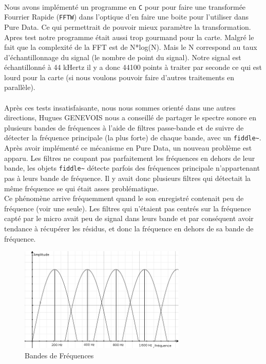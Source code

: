 \documentclass[a4paper, titlepage, oneside, 12pt]{article}%
\begin{document}
\paragraph{}
Nous avons implémenté un programme en \texttt{C} pour pour faire une transformée Fourrier Rapide (\texttt{FFTW}) dans l'optique d'en faire une boite pour l'utiliser dans Pure Data.
Ce qui permettrait de pouvoir mieux paramètre la transformation.\\

Apres test notre programme était aussi trop gourmand pour la carte. Malgré le fait que la complexité de la FFT est de N*log(N). Mais le N correspond au taux d’échantillonnage du signal (le nombre de point du signal). Notre signal est échantillonné à 44 kHertz il y a donc 44100 points à traiter par seconde ce qui est lourd pour la carte (si nous voulons pouvoir faire d'autres traitements en parallèle).

\paragraph{}
Après ces tests insatisfaisante, nous nous sommes orienté dans une autres directions, Hugues GENEVOIS nous a conseillé de partager le spectre sonore en plusieurs bandes de fréquences à l'aide de filtres passe-bande et de suivre de détecter la fréquence principale (la plus forte) de chaque bande, avec un \texttt{fiddle\~}.\\
Après avoir implémenté ce mécanisme en Pure Data, un nouveau problème est apparu. Les filtres ne coupant pas parfaitement les fréquences en dehors de leur bande, les objets \texttt{fiddle\~} détecte parfois des fréquences principale n’appartenant pas à leurs bande de fréquence. Il y avait donc plusieurs filtres qui détectait la même fréquence se qui était asses problématique.\\
Ce phénomène arrive fréquemment quand le son enregistré contenait peu de fréquence (voir une seule). Les filtres qui n’étaient pas centrés sur la fréquence capté par le micro avait peu de signal dans leurs bande et par conséquent avoir tendance à récupérer les résidus, et donc la fréquence en dehors de sa bande de fréquence.
\begin{figure}[H]
	\centering
	\includegraphics[width=300px]{filtre.jpg}
	\caption{Bandes de Fréquences}
\end{figure}
\end{document}
